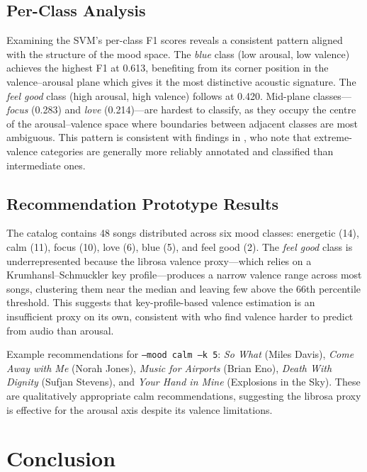\documentclass{article}
\begin{document}
\subsection{Per-Class Analysis}

Examining the SVM's per-class F1 scores reveals a consistent pattern aligned
with the structure of the mood space.
The \textit{blue} class (low arousal, low valence) achieves the highest F1
at 0.613, benefiting from its corner position in the valence--arousal plane
which gives it the most distinctive acoustic signature.
The \textit{feel good} class (high arousal, high valence) follows at 0.420.
Mid-plane classes---\textit{focus} (0.283) and \textit{love} (0.214)---are
hardest to classify, as they occupy the centre of the arousal--valence space
where boundaries between adjacent classes are most ambiguous.
This pattern is consistent with findings in \citet{eerola2011comparison},
who note that extreme-valence categories are generally more reliably annotated
and classified than intermediate ones.

\subsection{Recommendation Prototype Results}

The catalog contains 48 songs distributed across six mood classes:
energetic (14), calm (11), focus (10), love (6), blue (5), and feel good (2).
The \textit{feel good} class is underrepresented because the librosa valence
proxy---which relies on a Krumhansl--Schmuckler key profile---produces a
narrow valence range across most songs, clustering them near the median and
leaving few above the 66th percentile threshold.
This suggests that key-profile-based valence estimation is an insufficient
proxy on its own, consistent with \citet{yang2012machine} who find valence
harder to predict from audio than arousal.

Example recommendations for \texttt{--mood calm --k 5}: \textit{So What}
(Miles Davis), \textit{Come Away with Me} (Norah Jones), \textit{Music for
Airports} (Brian Eno), \textit{Death With Dignity} (Sufjan Stevens), and
\textit{Your Hand in Mine} (Explosions in the Sky).
These are qualitatively appropriate calm recommendations, suggesting the
librosa proxy is effective for the arousal axis despite its valence limitations.

%
\section{Conclusion}
\label{sec:conclusion}
%
\end{document}
